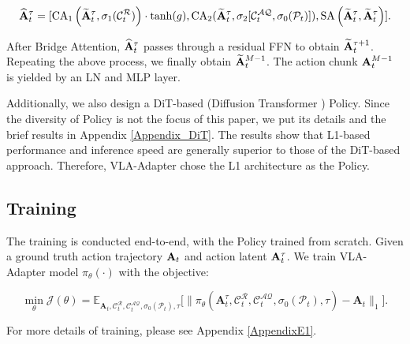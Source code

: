 \begin{equation}
\widehat{\bf{A}}_t^\tau = 
[\text{CA}_1\left(\widetilde{\bf{A}}^\tau_t,\sigma_1(\mathcal{C}_t^\mathcal{R})\right)\cdot \tanh(g), \text{CA}_2(\widetilde{\bf{A}}^\tau_t,\sigma_2[\mathcal{C}_t^\mathcal{AQ},  \sigma_0({\mathcal{P}_t})]), \text{SA}\left(\widetilde{\bf{A}}^\tau_t, \widetilde{\bf{A}}^\tau_t\right)].
\end{equation}

After Bridge Attention, $\widehat{\bf{A}}_t^\tau$ passes through a residual FFN to obtain $\widetilde{\bf A}^{\tau+1}_t$. Repeating the above process, we finally obtain $\widetilde{\bf A}^{M-1}_t$. The action chunk ${\bf A}^{M-1}_t$ is yielded by an LN and MLP layer. 

Additionally, we also design a DiT-based (Diffusion Transformer \citep{DiT-2023}) Policy. Since the diversity of Policy is not the focus of this paper, we put its details and the brief results in Appendix \ref{Appendix_DiT}. The results show that L1-based performance and inference speed are generally superior to those of the DiT-based approach. Therefore, VLA-Adapter chose the L1 architecture as the Policy.


\subsection{Training}\label{Subection_training}
The training is conducted end-to-end, with the Policy trained from scratch. Given a ground truth action trajectory ${{\bf{A}}_t}$ and action latent ${\bf{A}}_t^{\tau}$. We train VLA-Adapter model $\pi_\theta ( \cdot )$ with the objective:

\begin{equation}
\min_\theta \mathcal{J}(\theta) = \mathbb{E}_{\mathbf{A}_t, \mathcal{C}_t^{\mathcal{R}}, \mathcal{C}_t^{\mathcal{AQ}}, {\sigma _0}({\mathcal{P}_t}),\tau} \Big[\big\| \pi_\theta(\mathbf{A}_t^\tau, \mathcal{C}_t^{\mathcal{R}}, \mathcal{C}_t^{\mathcal{AQ}},{\sigma _0}({\mathcal{P}_t}),\tau) - \mathbf{A}_t \big\|_1\Big].
\end{equation}

For more details of training, please see Appendix \ref{AppendixE1}. 